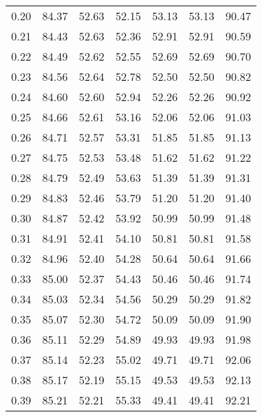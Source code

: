 \begin{tabular}{|c|c|c|c|c|c|c|}
      0.20 &     84.37 &     52.63 &      52.15 &   53.13 &      53.13 &         90.47 \\
      0.21 &     84.43 &     52.63 &      52.36 &   52.91 &      52.91 &         90.59 \\
      0.22 &     84.49 &     52.62 &      52.55 &   52.69 &      52.69 &         90.70 \\
      0.23 &     84.56 &     52.64 &      52.78 &   52.50 &      52.50 &         90.82 \\
      0.24 &     84.60 &     52.60 &      52.94 &   52.26 &      52.26 &         90.92 \\
      0.25 &     84.66 &     52.61 &      53.16 &   52.06 &      52.06 &         91.03 \\
      0.26 &     84.71 &     52.57 &      53.31 &   51.85 &      51.85 &         91.13 \\
      0.27 &     84.75 &     52.53 &      53.48 &   51.62 &      51.62 &         91.22 \\
      0.28 &     84.79 &     52.49 &      53.63 &   51.39 &      51.39 &         91.31 \\
      0.29 &     84.83 &     52.46 &      53.79 &   51.20 &      51.20 &         91.40 \\
      0.30 &     84.87 &     52.42 &      53.92 &   50.99 &      50.99 &         91.48 \\
      0.31 &     84.91 &     52.41 &      54.10 &   50.81 &      50.81 &         91.58 \\
      0.32 &     84.96 &     52.40 &      54.28 &   50.64 &      50.64 &         91.66 \\
      0.33 &     85.00 &     52.37 &      54.43 &   50.46 &      50.46 &         91.74 \\
      0.34 &     85.03 &     52.34 &      54.56 &   50.29 &      50.29 &         91.82 \\
      0.35 &     85.07 &     52.30 &      54.72 &   50.09 &      50.09 &         91.90 \\
      0.36 &     85.11 &     52.29 &      54.89 &   49.93 &      49.93 &         91.98 \\
      0.37 &     85.14 &     52.23 &      55.02 &   49.71 &      49.71 &         92.06 \\
      0.38 &     85.17 &     52.19 &      55.15 &   49.53 &      49.53 &         92.13 \\
      0.39 &     85.21 &     52.21 &      55.33 &   49.41 &      49.41 &         92.21 \\

\end{tabular}
